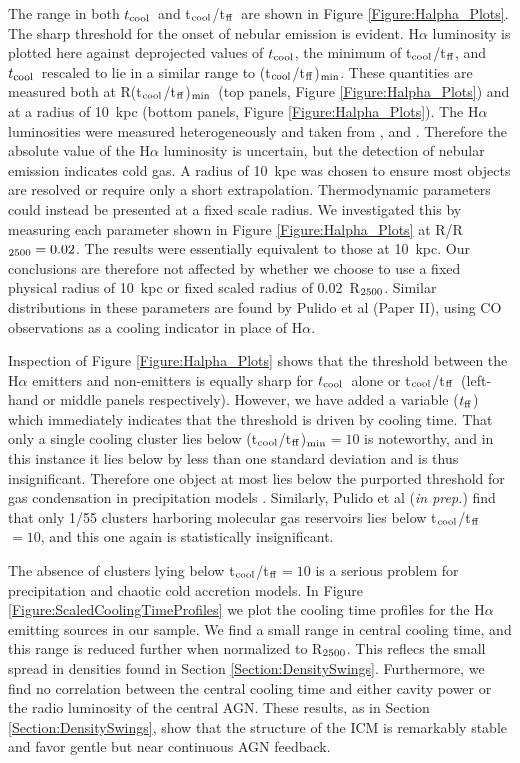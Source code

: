 \documentclass[twocolumn]{aastex6}
\newcommand{\tctff}{{t$_{\rm cool}$/t$_{\rm ff}$}}
\newcommand{\tctffmin}{(\tctff)$_{\rm min}$}
\newcommand{\Rtctffmin}{R(\tctff)$_{\rm min}$}
\newcommand{\tc}{$t_{\rm cool}$}
\newcommand{\tff}{$t_{\rm ff}$}
\begin{document}
The range in both \tc\ and \tctff\ are shown in Figure \ref{Figure:Halpha_Plots}.  The sharp threshold for the onset of nebular emission is evident. H$\alpha$ luminosity is plotted here against deprojected values of \tc, the minimum of \tctff, and \tc\ rescaled to lie in a similar range to \tctffmin.  These quantities are measured both at \Rtctffmin\ (top panels, Figure \ref{Figure:Halpha_Plots}) and at a radius of 10~kpc (bottom panels, Figure \ref{Figure:Halpha_Plots}).  The H$\alpha$ luminosities were measured heterogeneously and taken from \citet[][]{Crawford99,Cavagnolo09,McDonald10}, and \citet[][]{Rawle12}. Therefore the absolute value of the H$\alpha$ luminosity is uncertain, but the detection of nebular emission indicates cold gas.  A radius of 10~kpc was chosen to ensure most objects are resolved or require only a short extrapolation.  Thermodynamic parameters could instead be presented at a fixed scale radius.  We investigated this by measuring each parameter shown in Figure \ref{Figure:Halpha_Plots} at R/R$_{\rm 2500} = 0.02$.  The results were essentially equivalent to those at 10~kpc.  Our conclusions are therefore not affected by whether we choose to use a fixed physical radius of 10~kpc or fixed scaled radius of 0.02~R$_{\rm 2500}$. Similar distributions in these parameters are found by Pulido et al (Paper II), using CO observations as a cooling indicator in place of H$\alpha$.

Inspection of Figure \ref{Figure:Halpha_Plots} shows that the threshold between the H$\alpha$ emitters and non-emitters is equally sharp for \tc\ alone or \tctff\ (left-hand or middle panels respectively).  However, we have added a variable (\tff) which immediately indicates that the threshold is driven by cooling time.  That only a single cooling cluster lies below \tctffmin$= 10$ is noteworthy, and in this instance it lies below by less than one standard deviation and is thus insignificant.  Therefore one object at most lies below the purported threshold for gas condensation in precipitation models \cite[e.g.][]{McCourt12,Sharma12b,Gaspari13,Prasad15,Choudhury16}.  Similarly, Pulido et al ({\em in prep.}) find that only 1/55 clusters harboring molecular gas reservoirs lies below \tctff$= 10$, and this one again is statistically insignificant.

The absence of clusters lying below \tctff$= 10$ is a serious problem for precipitation and chaotic cold accretion models. In Figure \ref{Figure:ScaledCoolingTimeProfiles} we plot the cooling time profiles for the H$\alpha$ emitting sources in our sample.  We find a small range in central cooling time, and this range is reduced further when normalized to R$_{\rm 2500}$.  This reflecs the small spread in densities found in Section \ref{Section:DensitySwings}. Furthermore, we find no correlation between the central cooling time and either cavity power or the radio luminosity of the central AGN.  These results, as in Section \ref{Section:DensitySwings}, show that the structure of the ICM is remarkably stable and favor gentle but near continuous AGN feedback.
\end{document}
